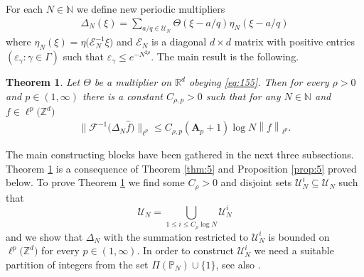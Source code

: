 \documentclass[a4paper,oneside]{amsart}
\theoremstyle{plain}
\newtheorem{theorem}{Theorem}
\theoremstyle{definition}
\numberwithin{equation}{section}
\newcounter{thm}
\theoremstyle{plain}
\newcommand{\RR}{\mathbb{R}}
\newcommand{\ZZ}{\mathbb{Z}}
\newcommand{\NN}{\mathbb{N}}
\newcommand{\boldA}{\mathbf{A}}
\newcommand{\calF}{\mathcal{F}}
\newcommand{\vnorm}[1]{{\left\lVert {#1} \right\rVert}}
\newcommand{\8}{\infty}
\begin{document}
For each $N \in \NN$
we define new periodic  multipliers
\begin{align}
	\label{eq:74}
	\Delta_N(\xi)
	=\sum_{a/q \in\mathscr{U}_N}
	 \Theta(\xi - a/q) \eta_N(\xi - a/q)
      \end{align}
where $\eta_N(\xi)=\eta\big(\mathcal E_N^{-1}\xi\big)$ and $\mathcal E_N$
is a diagonal $d\times d$  matrix with  positive entries
$(\varepsilon_{\gamma}: \gamma\in\Gamma)$ such that
$\varepsilon_{\gamma}
\le e^{-N^{2\rho}}$.
The main result is the following.
\begin{theorem}
	\label{th:3}
	Let $\Theta$ be a  multiplier on $\RR^d$ obeying \eqref{eq:155}. 
	Then for every $\rho>0$ and $p\in(1, \infty)$ there is a
        constant $C_{\rho, p} > 0$ such that
	for any $N\in\NN$ and $f \in \ell^p\big(\ZZ^d\big)$
	\begin{align}
		\label{eq:12}
		\big\lVert
		\calF^{-1}\big(\Delta_{N}
		\hat{f}\big)\big\rVert_{\ell^p} 
		\leq C_{\rho, p} (\boldA_p+1)\log N
		\vnorm{f}_{\ell^p}.
	\end{align}
\end{theorem}
The main constructing blocks have been gathered in the next three
subsections. Theorem \ref{th:3} is a consequence of Theorem
\ref{thm:5} and Proposition \ref{prop:5} proved below.  To prove
Theorem \ref{th:3} we find some $C_{\rho}>0$ and disjoint sets
$\mathscr{U}_N^i\subseteq\mathscr{U}_N$ such that
\[
\mathscr{U}_N=\bigcup_{1\le i\le C_{\rho}\log N}\mathscr{U}_N^i
\]
and we show that $\Delta_N$ with the
summation restricted to  $\mathscr{U}_N^i$ is bounded on
$\ell^p\big(\ZZ^d\big)$ for every $p\in(1, \infty)$. In order to
construct $\mathscr{U}_N^i$ we need a suitable partition of
integers from the set $\Pi(\mathbb P_{N})\cup\{1\}$, see also
\cite{iw}.
\end{document}
